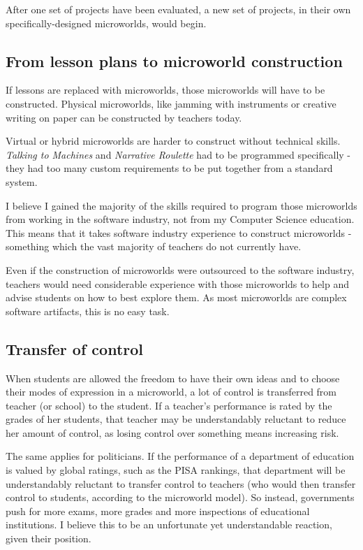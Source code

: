 After one set of projects have been evaluated, a new set of projects, in
their own specifically-designed microworlds, would begin.

\subsection{From lesson plans to microworld construction}

If lessons are replaced with microworlds, those microworlds will have to
be constructed. Physical microworlds, like jamming with instruments or
creative writing on paper can be constructed by teachers today.

Virtual or hybrid microworlds are harder to construct without technical
skills. \emph{Talking to Machines} and \emph{Narrative Roulette} had to
be programmed specifically - they had too many custom requirements to be
put together from a standard system.

I believe I gained the majority of the skills required to program those
microworlds from working in the software industry, not from my Computer
Science education. This means that it takes software industry experience
to construct microworlds - something which the vast majority of teachers
do not currently have.

Even if the construction of microworlds were outsourced to the software
industry, teachers would need considerable experience with those
microworlds to help and advise students on how to best explore them. As
most microworlds are complex software artifacts, this is no
easy task.

\subsection{Transfer of control}

When students are allowed the freedom to have their own ideas and to choose
their modes of expression in a microworld, a lot of control is transferred from teacher (or school) to the student. If a teacher's performance is rated by the
grades of her students, that teacher may be understandably reluctant to
reduce her amount of control, as losing control over something means
increasing risk.

The same applies for politicians. If the performance of a department of
education is valued by global ratings, such as the PISA rankings, that
department will be understandably reluctant to transfer control to
teachers (who would then transfer control to students, according to the
microworld model). So instead, governments push for more exams, more
grades\cite{dn:bjorklund} and more inspections of educational institutions\cite{pedmag}. I believe this to be an unfortunate yet understandable reaction, given their position.

